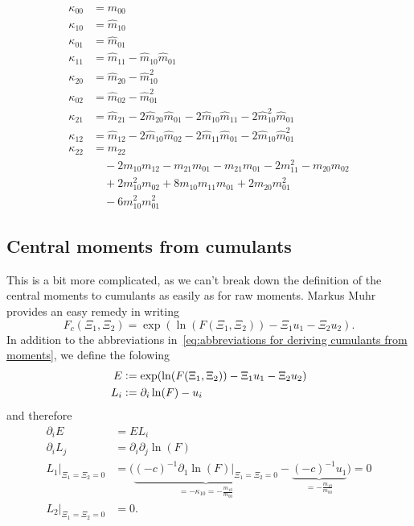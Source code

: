 \documentclass{article}
\begin{document}
\begin{align}
  \kappa_{00} & = m_{00} \label{eq: kappa_00 from moments}\\
  \kappa_{10} & = \hat{m}_{10} \label{eq: kappa_10 from moments}\\
  \kappa_{01} & = \hat{m}_{01} \label{eq: kappa_01 from moments}\\
  \kappa_{11} & = \hat{m}_{11} - \hat{m}_{10}\hat{m}_{01} \\
  \kappa_{20} & = \hat{m}_{20} - \hat{m}_{10}^2 \\
  \kappa_{02} & = \hat{m}_{02} - \hat{m}_{01}^2 \\
  \kappa_{21} & = \hat{m}_{21} - 2 \hat{m}_{20} \hat{m}_{01}
            - 2 \hat{m}_{10} \hat{m}_{11} - 2 \hat{m}_{10}^2\hat{m}_{01} \\
  \kappa_{12} & = \hat{m}_{12} - 2 \hat{m}_{10} \hat{m}_{02}
            - 2 \hat{m}_{11} \hat{m}_{01} - 2 \hat{m}_{10}\hat{m}_{01}^2 \\
  \kappa_{22} & = m_{22} \\
       & \quad - 2 m_{10}m_{12}  - m_{21}m_{01} - m_{21}m_{01} - 2 m_{11}^2 - m_{20}m_{02} \\
       & \quad +  2m_{10}^2 m_{02} + 8 m_{10}m_{11}m_{01} + 2m_{20}m_{01}^2 \\
       & \quad - 6 m_{10}^2 m_{01}^2
\end{align}

\subsection{Central moments from cumulants}
\label{sub:Central moments from cumulants}

This is a bit more complicated, as we can't break down the definition of the central moments to cumulants as easily as for raw moments.
Markus Muhr provides an easy remedy in writing
\begin{equation}
  F_c(\Xi_1, \Xi_2) = \exp(\ln(F(\Xi_1,\Xi_2)) - \Xi_1 u_1 - \Xi_2 u_2).
\end{equation}
In addition to the abbreviations in~\eqref{eq:abbreviations for deriving cumulants from moments}, we define the folowing
\begin{equation}
  \begin{aligned}
    E & \mathrel{\mathop:}= \exp(\ln(F(\Xi_1,\Xi_2)) - \Xi_1 u_1 - \Xi_2 u_2) \\
    L_i & \mathrel{\mathop:}= \partial_i \ln(F) - u_i
  \end{aligned}
\end{equation}
and therefore
\begin{equation}
  \begin{aligned}
    \partial_i E & = EL_i \\
    \partial_i L_j & = \partial_i\partial_j\ln(F)\\
    L_1\bigr|_{\Xi_1=\Xi_2 = 0} & = \bigg(
      \underbrace{{(-c)}^{-1} \partial_1\ln(F) \bigr|_{\Xi_1=\Xi_2 = 0}}_{=-\kappa_{10}=-\frac{m_{10}}{m_{00}}}
      - \underbrace{{(-c)}^{-1}u_1}_{=-\frac{m_{10}}{m_{00}}} \bigg) = 0 \\
    L_2\bigr|_{\Xi_1=\Xi_2 = 0} & = 0.
  \end{aligned}
\end{equation}
\end{document}
